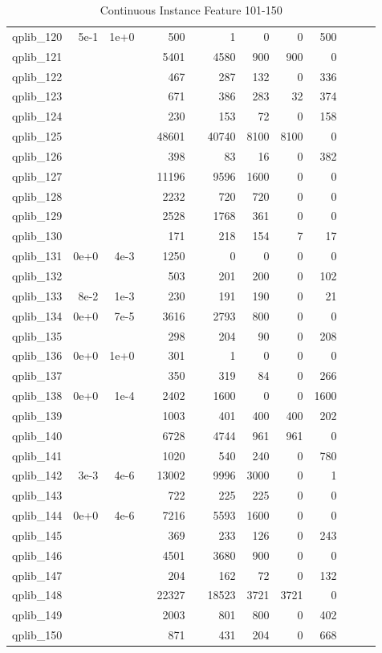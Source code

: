 \begin{table}
\begin{tabular}{lrrrrrrrrrrrr}
qplib\_120	&	5e-1	&	1e+0	&	&	500	&	&	1	&	0	&	0	&	500	\\
qplib\_121	&		&		&	&	5401	&	&	4580	&	900	&	900	&	0	\\
qplib\_122	&		&		&	&	467	&	&	287	&	132	&	0	&	336	\\
qplib\_123	&		&		&	&	671	&	&	386	&	283	&	32	&	374	\\
qplib\_124	&		&		&	&	230	&	&	153	&	72	&	0	&	158	\\
qplib\_125	&		&		&	&	48601	&	&	40740	&	8100	&	8100	&	0	\\
qplib\_126	&		&		&	&	398	&	&	83	&	16	&	0	&	382	\\
qplib\_127	&		&		&	&	11196	&	&	9596	&	1600	&	0	&	0	\\
qplib\_128	&		&		&	&	2232	&	&	720	&	720	&	0	&	0	\\
qplib\_129	&		&		&	&	2528	&	&	1768	&	361	&	0	&	0	\\
qplib\_130	&		&		&	&	171	&	&	218	&	154	&	7	&	17	\\
qplib\_131	&	0e+0	&	4e-3	&	&	1250	&	&	0	&	0	&	0	&	0	\\
qplib\_132	&		&		&	&	503	&	&	201	&	200	&	0	&	102	\\
qplib\_133	&	8e-2	&	1e-3	&	&	230	&	&	191	&	190	&	0	&	21	\\
qplib\_134	&	0e+0	&	7e-5	&	&	3616	&	&	2793	&	800	&	0	&	0	\\
qplib\_135	&		&		&	&	298	&	&	204	&	90	&	0	&	208	\\
qplib\_136	&	0e+0	&	1e+0	&	&	301	&	&	1	&	0	&	0	&	0	\\
qplib\_137	&		&		&	&	350	&	&	319	&	84	&	0	&	266	\\
qplib\_138	&	0e+0	&	1e-4	&	&	2402	&	&	1600	&	0	&	0	&	1600	\\
qplib\_139	&		&		&	&	1003	&	&	401	&	400	&	400	&	202	\\
qplib\_140	&		&		&	&	6728	&	&	4744	&	961	&	961	&	0	\\
qplib\_141	&		&		&	&	1020	&	&	540	&	240	&	0	&	780	\\
qplib\_142	&	3e-3	&	4e-6	&	&	13002	&	&	9996	&	3000	&	0	&	1	\\
qplib\_143	&		&		&	&	722	&	&	225	&	225	&	0	&	0	\\
qplib\_144	&	0e+0	&	4e-6	&	&	7216	&	&	5593	&	1600	&	0	&	0	\\
qplib\_145	&		&		&	&	369	&	&	233	&	126	&	0	&	243	\\
qplib\_146	&		&		&	&	4501	&	&	3680	&	900	&	0	&	0	\\
qplib\_147	&		&		&	&	204	&	&	162	&	72	&	0	&	132	\\
qplib\_148	&		&		&	&	22327	&	&	18523	&	3721	&	3721	&	0	\\
qplib\_149	&		&		&	&	2003	&	&	801	&	800	&	0	&	402	\\
qplib\_150	&		&		&	&	871	&	&	431	&	204	&	0	&	668	\\
												


\bottomrule

\end{tabular}  
\label{tab:B3}
\caption{Continuous  Instance Feature 101-150} 

\end{table}

